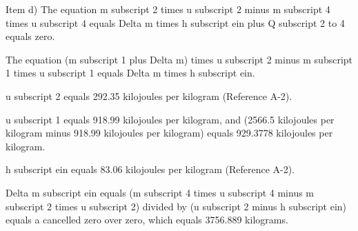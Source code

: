 Item d) The equation m subscript 2 times u subscript 2 minus m subscript 4 times u subscript 4 equals Delta m times h subscript ein plus Q subscript 2 to 4 equals zero.

The equation (m subscript 1 plus Delta m) times u subscript 2 minus m subscript 1 times u subscript 1 equals Delta m times h subscript ein.

u subscript 2 equals 292.35 kilojoules per kilogram (Reference A-2).

u subscript 1 equals 918.99 kilojoules per kilogram, and (2566.5 kilojoules per kilogram minus 918.99 kilojoules per kilogram) equals 929.3778 kilojoules per kilogram.

h subscript ein equals 83.06 kilojoules per kilogram (Reference A-2).

Delta m subscript ein equals (m subscript 4 times u subscript 4 minus m subscript 2 times u subscript 2) divided by (u subscript 2 minus h subscript ein) equals a cancelled zero over zero, which equals 3756.889 kilograms.